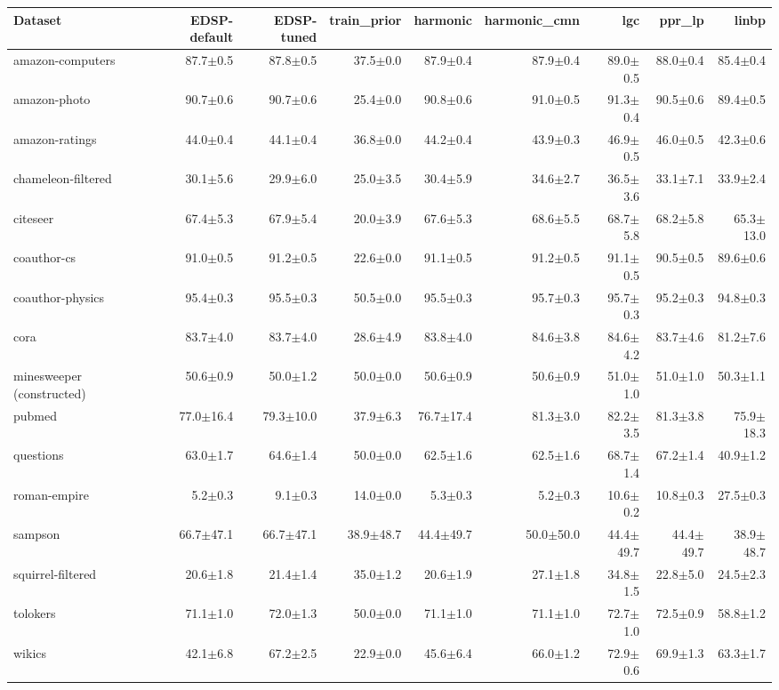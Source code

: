 \begin{tabular}{lrrrrrrrr}
\toprule
Dataset & EDSP-default & EDSP-tuned & train\_prior & harmonic & harmonic\_cmn & lgc & ppr\_lp & linbp \\
\midrule
amazon-computers & 87.7$\pm$0.5 & 87.8$\pm$0.5 & 37.5$\pm$0.0 & 87.9$\pm$0.4 & 87.9$\pm$0.4 & 89.0$\pm$0.5 & 88.0$\pm$0.4 & 85.4$\pm$0.4 \\
amazon-photo & 90.7$\pm$0.6 & 90.7$\pm$0.6 & 25.4$\pm$0.0 & 90.8$\pm$0.6 & 91.0$\pm$0.5 & 91.3$\pm$0.4 & 90.5$\pm$0.6 & 89.4$\pm$0.5 \\
amazon-ratings & 44.0$\pm$0.4 & 44.1$\pm$0.4 & 36.8$\pm$0.0 & 44.2$\pm$0.4 & 43.9$\pm$0.3 & 46.9$\pm$0.5 & 46.0$\pm$0.5 & 42.3$\pm$0.6 \\
chameleon-filtered & 30.1$\pm$5.6 & 29.9$\pm$6.0 & 25.0$\pm$3.5 & 30.4$\pm$5.9 & 34.6$\pm$2.7 & 36.5$\pm$3.6 & 33.1$\pm$7.1 & 33.9$\pm$2.4 \\
citeseer & 67.4$\pm$5.3 & 67.9$\pm$5.4 & 20.0$\pm$3.9 & 67.6$\pm$5.3 & 68.6$\pm$5.5 & 68.7$\pm$5.8 & 68.2$\pm$5.8 & 65.3$\pm$13.0 \\
coauthor-cs & 91.0$\pm$0.5 & 91.2$\pm$0.5 & 22.6$\pm$0.0 & 91.1$\pm$0.5 & 91.2$\pm$0.5 & 91.1$\pm$0.5 & 90.5$\pm$0.5 & 89.6$\pm$0.6 \\
coauthor-physics & 95.4$\pm$0.3 & 95.5$\pm$0.3 & 50.5$\pm$0.0 & 95.5$\pm$0.3 & 95.7$\pm$0.3 & 95.7$\pm$0.3 & 95.2$\pm$0.3 & 94.8$\pm$0.3 \\
cora & 83.7$\pm$4.0 & 83.7$\pm$4.0 & 28.6$\pm$4.9 & 83.8$\pm$4.0 & 84.6$\pm$3.8 & 84.6$\pm$4.2 & 83.7$\pm$4.6 & 81.2$\pm$7.6 \\
minesweeper (constructed) & 50.6$\pm$0.9 & 50.0$\pm$1.2 & 50.0$\pm$0.0 & 50.6$\pm$0.9 & 50.6$\pm$0.9 & 51.0$\pm$1.0 & 51.0$\pm$1.0 & 50.3$\pm$1.1 \\
pubmed & 77.0$\pm$16.4 & 79.3$\pm$10.0 & 37.9$\pm$6.3 & 76.7$\pm$17.4 & 81.3$\pm$3.0 & 82.2$\pm$3.5 & 81.3$\pm$3.8 & 75.9$\pm$18.3 \\
questions & 63.0$\pm$1.7 & 64.6$\pm$1.4 & 50.0$\pm$0.0 & 62.5$\pm$1.6 & 62.5$\pm$1.6 & 68.7$\pm$1.4 & 67.2$\pm$1.4 & 40.9$\pm$1.2 \\
roman-empire & 5.2$\pm$0.3 & 9.1$\pm$0.3 & 14.0$\pm$0.0 & 5.3$\pm$0.3 & 5.2$\pm$0.3 & 10.6$\pm$0.2 & 10.8$\pm$0.3 & 27.5$\pm$0.3 \\
sampson & 66.7$\pm$47.1 & 66.7$\pm$47.1 & 38.9$\pm$48.7 & 44.4$\pm$49.7 & 50.0$\pm$50.0 & 44.4$\pm$49.7 & 44.4$\pm$49.7 & 38.9$\pm$48.7 \\
squirrel-filtered & 20.6$\pm$1.8 & 21.4$\pm$1.4 & 35.0$\pm$1.2 & 20.6$\pm$1.9 & 27.1$\pm$1.8 & 34.8$\pm$1.5 & 22.8$\pm$5.0 & 24.5$\pm$2.3 \\
tolokers & 71.1$\pm$1.0 & 72.0$\pm$1.3 & 50.0$\pm$0.0 & 71.1$\pm$1.0 & 71.1$\pm$1.0 & 72.7$\pm$1.0 & 72.5$\pm$0.9 & 58.8$\pm$1.2 \\
wikics & 42.1$\pm$6.8 & 67.2$\pm$2.5 & 22.9$\pm$0.0 & 45.6$\pm$6.4 & 66.0$\pm$1.2 & 72.9$\pm$0.6 & 69.9$\pm$1.3 & 63.3$\pm$1.7 \\
\bottomrule
\end{tabular}
